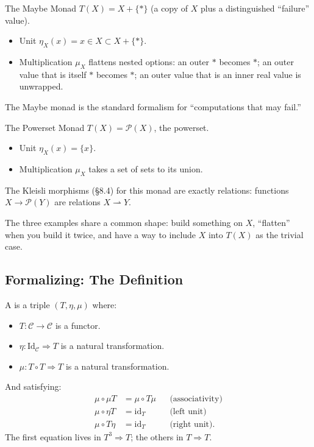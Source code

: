 \begin{example}{The Maybe Monad}
$T(X) = X + \{*\}$ (a copy of $X$ plus a distinguished ``failure'' value).
\begin{itemize}
  \item Unit $\eta_X(x) = x \in X \subset X + \{*\}$.
  \item Multiplication $\mu_X$ flattens nested options: an outer $*$
        becomes $*$; an outer value that is itself $*$ becomes $*$;
        an outer value that is an inner real value is unwrapped.
\end{itemize}
The Maybe monad is the standard formalism for ``computations that may
fail.''
\end{example}

\begin{example}{The Powerset Monad}
$T(X) = \mathcal{P}(X)$, the powerset.
\begin{itemize}
  \item Unit $\eta_X(x) = \{x\}$.
  \item Multiplication $\mu_X$ takes a set of sets to its union.
\end{itemize}
The Kleisli morphisms (\S 8.4) for this monad are exactly relations:
functions $X \to \mathcal{P}(Y)$ are relations $X \rightharpoonup Y$.
\end{example}

\begin{dialog}
The three examples share a common shape: build something on $X$, ``flatten''
when you build it twice, and have a way to include $X$ into $T(X)$ as the
trivial case.
\end{dialog}

\subsection{Formalizing: The Definition}

A  is a triple $(T, \eta, \mu)$ where:
\begin{itemize}
  \item $T : \mathcal{C} \to \mathcal{C}$ is a functor.
  \item $\eta : \mathrm{Id}_\mathcal{C} \Rightarrow T$ is a natural
        transformation.
  \item $\mu : T \circ T \Rightarrow T$ is a natural transformation.
\end{itemize}
And satisfying:
\begin{align*}
  \mu \circ \mu T &= \mu \circ T \mu
    && \text{(associativity)} \\
  \mu \circ \eta T &= \mathrm{id}_T
    && \text{(left unit)} \\
  \mu \circ T \eta &= \mathrm{id}_T
    && \text{(right unit).}
\end{align*}
The first equation lives in $T^3 \Rightarrow T$; the others in
$T \Rightarrow T$.

